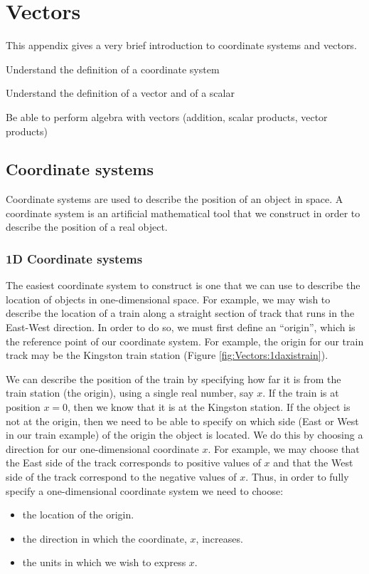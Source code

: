 \chapter{Vectors}
\label{app:vectors}
This appendix gives a very brief introduction to coordinate systems and vectors.
 \vspace{1cm}
\begin{learningObjectives}{
\item Understand the definition of a coordinate system
\item Understand the definition of a vector and of a scalar
\item Be able to perform algebra with vectors (addition, scalar products, vector products)}
\end{learningObjectives}

\section{Coordinate systems}
Coordinate systems are used to describe the position of an object in space. A coordinate system is an artificial mathematical tool that we construct in order to describe the position of a real object. 

\subsection{1D Coordinate systems} 
The easiest coordinate system to construct is one that we can use to describe the location of objects in one-dimensional space. For example, we may wish to describe the location of a train along a straight section of track that runs in the East-West direction. In order to do so, we must first define an ``origin'', which is the reference point of our coordinate system. For example, the origin for our train track may be the Kingston train station (Figure \ref{fig:Vectors:1daxistrain}).

We can describe the position of the train by specifying how far it is from the train station (the origin), using a single real number, say $x$. If the train is at position $x=0$, then we know that it is at the Kingston station. If the object is not at the origin, then we need to be able to specify on which side (East or West in our train example) of the origin the object is located. We do this by choosing a direction for our one-dimensional coordinate $x$. For example, we may choose that the East side of the track corresponds to positive values of $x$ and that the West side of the track correspond to the negative values of $x$. Thus, in order to fully specify a one-dimensional coordinate system we need to choose:
\begin{itemize}
\item the location of the origin.
\item the direction in which the coordinate, $x$, increases.
\item the units in which we wish to express $x$.
\end{itemize} 

